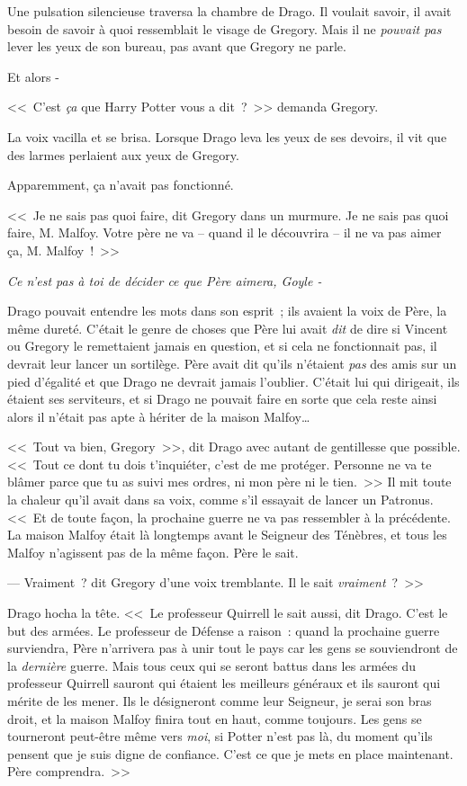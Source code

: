Une pulsation silencieuse traversa la chambre de Drago. Il voulait savoir, il avait besoin de savoir à quoi ressemblait le visage de Gregory. Mais il ne \emph{pouvait pas} lever les yeux de son bureau, pas avant que Gregory ne parle.

Et alors -

<<~C'est \emph{ça} que Harry Potter vous a dit~?~>> demanda Gregory.

La voix vacilla et se brisa. Lorsque Drago leva les yeux de ses devoirs, il vit que des larmes perlaient aux yeux de Gregory.

Apparemment, ça n'avait pas fonctionné.

<<~Je ne sais pas quoi faire, dit Gregory dans un murmure. Je ne sais pas quoi faire, M. Malfoy. Votre père ne va -- quand il le découvrira -- il ne va pas aimer ça, M. Malfoy~!~>>

\emph{Ce n'est pas à toi de décider ce que Père aimera, Goyle -}

Drago pouvait entendre les mots dans son esprit~; ils avaient la voix de Père, la même dureté. C'était le genre de choses que Père lui avait \emph{dit} de dire si Vincent ou Gregory le remettaient jamais en question, et si cela ne fonctionnait pas, il devrait leur lancer un sortilège. Père avait dit qu'ils n'étaient \emph{pas} des amis sur un pied d'égalité et que Drago ne devrait jamais l'oublier. C'était lui qui dirigeait, ils étaient ses serviteurs, et si Drago ne pouvait faire en sorte que cela reste ainsi alors il n'était pas apte à hériter de la maison Malfoy…

<<~Tout va bien, Gregory~>>, dit Drago avec autant de gentillesse que possible. <<~Tout ce dont tu dois t'inquiéter, c'est de me protéger. Personne ne va te blâmer parce que tu as suivi mes ordres, ni mon père ni le tien.~>> Il mit toute la chaleur qu'il avait dans sa voix, comme s'il essayait de lancer un Patronus. <<~Et de toute façon, la prochaine guerre ne va pas ressembler à la précédente. La maison Malfoy était là longtemps avant le Seigneur des Ténèbres, et tous les Malfoy n'agissent pas de la même façon. Père le sait.

--- Vraiment~? dit Gregory d'une voix tremblante. Il le sait \emph{vraiment}~?~>>

Drago hocha la tête. <<~Le professeur Quirrell le sait aussi, dit Drago. C'est le but des armées. Le professeur de Défense a raison~: quand la prochaine guerre surviendra, Père n'arrivera pas à unir tout le pays car les gens se souviendront de la \emph{dernière} guerre. Mais tous ceux qui se seront battus dans les armées du professeur Quirrell sauront qui étaient les meilleurs généraux et ils sauront qui mérite de les mener. Ils le désigneront comme leur Seigneur, je serai son bras droit, et la maison Malfoy finira tout en haut, comme toujours. Les gens se tourneront peut-être même vers \emph{moi}, si Potter n'est pas là, du moment qu'ils pensent que je suis digne de confiance. C'est ce que je mets en place maintenant. Père comprendra.~>>

